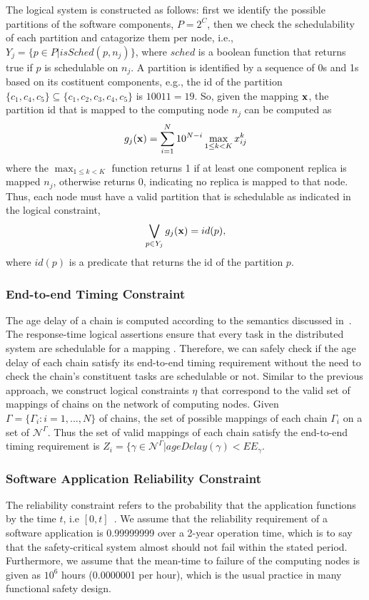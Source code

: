 The logical system is constructed as follows: first we identify the possible partitions of the software components, $P=2^C$, then we check the schedulability of each partition and catagorize them per node, i.e., $Y_j=\{p\in P| isSched(p,n_j)\}$, where $sched$ is a boolean function that returns true if $p$ is schedulable on $n_j$.  A partition is identified by a sequence of 0s and 1s based on its costituent components, e.g., the id of the partition $\{c_1,c_4,c_5\}\subseteq \{c_1,c_2,c_3,c_4,c_5\}$ is $10011=19$. So, given the mapping $\textbf{x}$, the partition id that is mapped to the computing node $n_j$ can be computed as
\begin{align}
	g_j(\textbf{x})=\sum_{i=1}^{N}{10^{N-i}\max_{1\leq k< K}x^{k}_{ij}}
\end{align}
where the $\max_{1\leq k< K}$ function returns 1 if at least one component replica is mapped $n_j$, otherwise returns 0, indicating no replica is mapped to that node. Thus, each node must have a valid partition that is schedulable as indicated in the logical constraint,
\begin{align}
\bigvee\limits_{p\in Y_j}g_j (\textbf{x})= id(p) ,
\end{align}
where $id(p)$ is a predicate that returns the id of the partition $p$.

\subsubsection{End-to-end Timing Constraint}
The age delay of a chain is computed according to the semantics discussed in~\cite{Feiertag2009ASemantics}\cite{mubeen2013support}. The response-time logical assertions ensure that every task in the distributed system are schedulable for a mapping \ttx. Therefore, we can safely check if the age delay of each chain satisfy its end-to-end timing requirement without the need to check the chain's constituent tasks are schedulable or not. Similar to the previous approach, we construct logical constraints $\eta$ that correspond to the valid set of mappings of chains on the network of computing nodes.  Given $\Gamma =\{\Gamma_i:i=1,...,N\}$ of chains, the set of possible mappings of each chain $\Gamma_i$ on a set of $\mathcal{N}^\Gamma$. Thus the set of valid mappings of each chain satisfy the end-to-end timing requirement is $Z_i=\{\gamma\in \mathcal{N}^\Gamma| ageDelay(\gamma) < EE_\gamma$.

\subsubsection{Software Application Reliability Constraint}
The reliability constraint refers to the probability that the application functions by the time $t$, i.e $[0,t]$~\cite{Goel1985SoftwareApplicability}. We assume that the reliability requirement of a software application is 0.99999999 over a 2-year operation time, which is to say  that the safety-critical system almost should not fail within the stated period. Furthermore, we assume that the mean-time to failure of the computing nodes is given as $10^6$ hours (0.0000001 per hour), which is the usual practice in many functional safety design.

